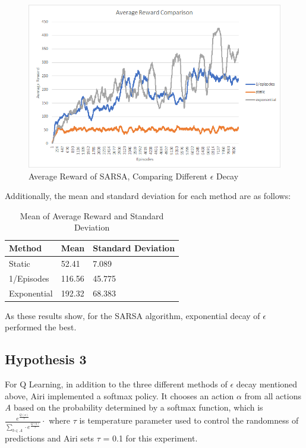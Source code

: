 \begin{figure}[H] %
    \centering
    \includegraphics[width=0.75\linewidth]{epsilon-decay-comparison.png}
    \caption{Average Reward of SARSA, Comparing Different $\epsilon$ Decay}
\end{figure}

Additionally, the mean and standard deviation for each method are as follows:

\begin{table}[H]
    \begin{tabular}{lll}
    \hline
    Method      & Mean   & Standard Deviation \\ \hline
    Static      & 52.41  & 7.089              \\
    1/Episodes  & 116.56  & 45.775             \\
    Exponential & 192.32 & 68.383             \\ \hline
    \end{tabular}
    \caption{Mean of Average Reward and Standard Deviation}
\end{table}

As these results show, for the SARSA algorithm, exponential decay of $\epsilon$ performed the best.

\subsection{Hypothesis 3}

For Q Learning, in addition to the three different methods of $\epsilon$ decay mentioned above, Airi implemented a softmax policy. It chooses an action $\alpha$ from all actions \textit{A} based on the probability determined by a softmax function, which is $   \frac {e^{\frac{Q(a)}{\tau}}}{\sum_{b \in A}\cdot e^{\frac{Q(b)}{\tau}}} \cdot $ where $\tau$ is temperature parameter used to control the randomness of predictions and Airi sets $\tau$  = 0.1 for this experiment. 

